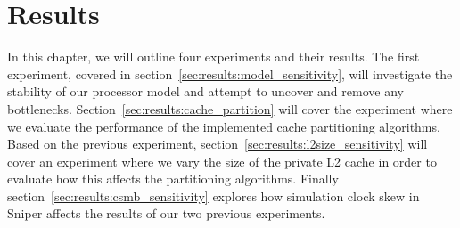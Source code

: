 
\chapter{Results}
\label{cpt:results}

In this chapter, we will outline four experiments and their results.
The first experiment, covered in section~\ref{sec:results:model_sensitivity}, will investigate the stability of our processor model and attempt to uncover  and remove any bottlenecks.
Section~\ref{sec:results:cache_partition} will cover the experiment where we evaluate the performance of the implemented cache partitioning algorithms.
Based on the previous experiment, section~\ref{sec:results:l2size_sensitivity} will cover an experiment where we vary the size of the private L2 cache in order to evaluate how this affects the partitioning algorithms.
Finally section~\ref{sec:results:csmb_sensitivity} explores how simulation clock skew in Sniper affects the results of our two previous experiments.








